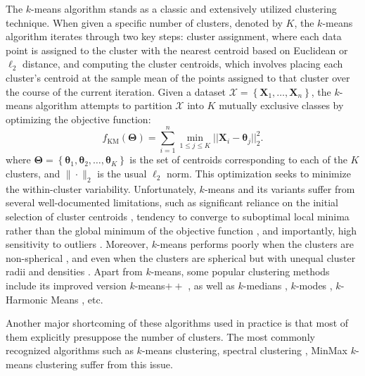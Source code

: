 \documentclass[11pt]{article}
\newcommand{\bX}{\boldsymbol{X}}
\newcommand{\btheta}{\boldsymbol{\theta}}
\newcommand{\bTheta}{\boldsymbol{\Theta}}
\begin{document}
The $k$-means algorithm \citep{llyod-kmeans} stands as a classic and extensively utilized clustering technique. When given a specific number of clusters, denoted by $K$, the $k$-means algorithm iterates through two key steps: cluster assignment, where each data point is assigned to the cluster with the nearest centroid based on Euclidean or $\ell_2$ distance, and computing the cluster centroids, which involves placing each cluster's centroid at the sample mean of the points assigned to that cluster over the course of the current iteration. Given a dataset $\mathcal{X}=\left\{{\bX}_1, \ldots, {\bX}_n\right\}$, the $k$-means algorithm attempts to partition $\mathcal{X}$ into $K$ mutually exclusive classes by optimizing the objective function: 
\begin{equation}
    f_{\operatorname{KM}}(\bTheta) = \sum_{i=1}^n \displaystyle\min_{1 \leq j \leq K} ||\bX_i-\btheta_j||_2^2.
\end{equation}
where $\bTheta=\left\{\btheta_1, \btheta_2, \ldots, \btheta_K\right\}$ is the set of centroids corresponding to each of the $K$ clusters, and $\|\cdot\|_2$ is the usual $\ell_2$ norm. This optimization seeks to minimize the within-cluster variability.
Unfortunately, $k$-means and its variants suffer from several well-documented limitations, such as significant reliance on the initial selection of cluster centroids \citep{pmlr-v70-bachem17b}, tendency to converge to suboptimal local minima rather than the global minimum of the objective function \citep{xu-lange-2019}, and importantly, high sensitivity to outliers \citep{K-means-outliers}. Moreover, $k$-means performs poorly when the clusters are non-spherical \citep{spectral-andrew-ng}, and even when the clusters are spherical but with unequal cluster radii and densities \citep{Raykov2016-mg}. Apart from $k$-means, some popular clustering methods include its improved version $k$-means$++$ \citep{Arthur2007kmeansTA}, as well as $k$-medians \citep{bradley-k-median,k-median}, $k$-modes \citep{Chaturvedi2001}, $k$-Harmonic Means \citep{Zhang-1999-KHM}, etc.


Another major shortcoming of these algorithms used in practice is that most of them explicitly presuppose the number of clusters. The most commonly recognized algorithms such as $k$-means clustering, spectral clustering \citep{spectral-andrew-ng}, MinMax $k$-means clustering \citep{minmax-km} suffer from this issue. 
\end{document}
